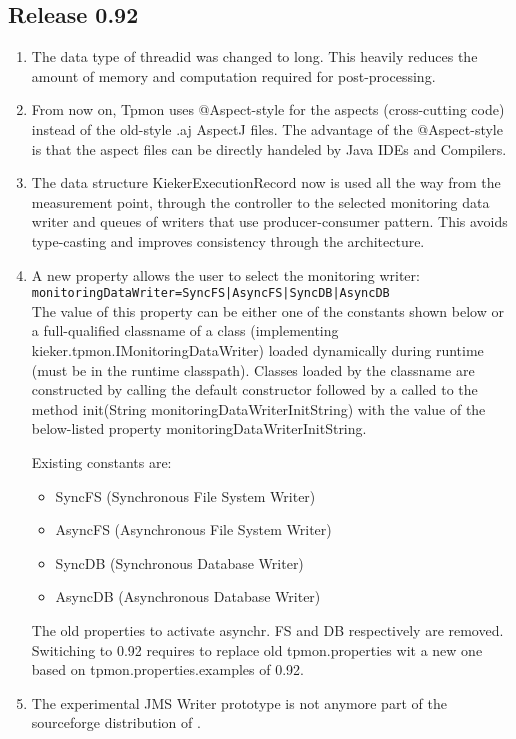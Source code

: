 \documentclass{scrartcl}
\begin{document}
\subsection{Release 0.92}
\begin{enumerate}
\item The data type of threadid was changed to long. This heavily reduces the amount of memory and computation required for post-processing.
\item From now on, Tpmon uses  @Aspect-style for the aspects (cross-cutting code) instead of the old-style 
    .aj AspectJ files. The advantage of the @Aspect-style is that the aspect files can be directly handeled by Java IDEs and Compilers. 
\item The data structure KiekerExecutionRecord now is used all the way from the measurement point, through the controller to the selected monitoring data writer and queues of writers that use producer-consumer pattern. This avoids type-casting and improves consistency through the architecture.
\item  A new property allows the user to select the monitoring writer: \\
    \verb.monitoringDataWriter=SyncFS|AsyncFS|SyncDB|AsyncDB. \\
The value of this property can be either one of the constants shown below or a full-qualified 
classname of a class (implementing kieker.tpmon.IMonitoringDataWriter) loaded
dynamically during runtime (must be in the runtime classpath). Classes loaded by 
the classname are constructed by calling the default constructor followed by a
called to the method init(String monitoringDataWriterInitString) with the 
value of the below-listed property monitoringDataWriterInitString.

Existing constants are:
\begin{itemize}
\item SyncFS (Synchronous File System Writer)
\item AsyncFS (Asynchronous File System Writer)
\item SyncDB (Synchronous Database Writer)
\item AsyncDB (Asynchronous Database Writer)
\end{itemize}
The old properties to activate asynchr. FS and DB respectively are removed. Switiching to 
\tpmon{} 0.92 requires to replace old tpmon.properties wit a new one based on tpmon.properties.examples of 0.92.

\item The experimental JMS Writer prototype is not anymore part of the sourceforge distribution of \tpmon{}.
\end{enumerate}
\end{document}
